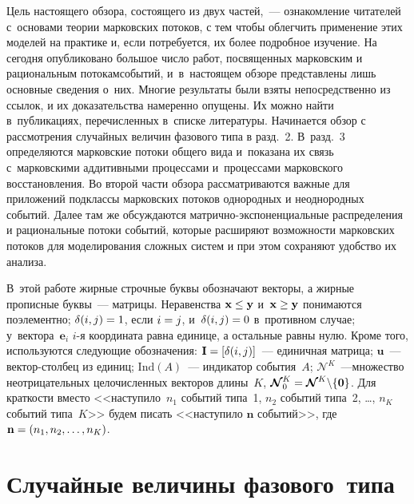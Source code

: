{\begin{multicols}{2}
    Цель настоящего обзора, состоящего из двух частей,~--- ознакомление 
читателей с~основами тео\-рии марковских потоков, с тем чтобы облегчить\linebreak 
применение этих моделей на практике и, если потребуется, их более подробное 
изучение. На сегодня опубликовано большое число работ, посвященных 
марковским и рациональным потокам\linebreak событий, и~в~настоящем обзоре 
представлены лишь основные сведения о~них. Многие результаты были взяты 
непосредственно из ссылок, и их доказательства намеренно опущены. Их 
можно найти в~пуб\-ли\-ка\-ци\-ях, перечисленных в~списке литературы. Начинается 
обзор с рассмотрения случайных величин фазового типа в разд.~2. В~разд.~3 
определяются марковские потоки общего вида и~показана их связь 
с~марковскими аддитивными процессами и~процессами марковского 
восстановления. Во второй части обзора рассматриваются важные для 
приложений подклассы марковских потоков однородных и неоднородных 
событий. Далее там же обсуждаются мат\-рич\-но-экс\-по\-нен\-ци\-аль\-ные 
распределения и рациональные потоки событий, которые расширяют 
возможности марковских потоков для моделирования сложных систем и при 
этом сохраняют удобство их анализа. 

    В~этой работе жирные строчные буквы обозначают векторы, а жирные 
прописные буквы~--- мат\-ри\-цы. Неравенства $\mathbf{x}\hm\leq 
\mathbf{y}$ и~$\mathbf{x}\hm\geq \mathbf{y}$ понимаются поэлементно; 
$\delta(i,j)\hm=1$, если $i\hm=j$, и~$\delta(i,j)\hm=0$ в~противном случае; 
у~вектора~$\mathbf{e}_i$ $i$-я координата равна единице, а остальные равны 
нулю. Кроме того, используются следующие обозначения: $\mathbf{I}\hm= 
[\delta(i,j)]$~--- единичная матрица; $\mathbf{u}$~---  век\-тор-стол\-бец из 
единиц; $\mathrm{Ind}(A)$~---  индикатор события~$A$; 
$\boldsymbol{\mathcal{N}}^K$~---множество неотрицательных целочисленных 
векторов длины~$K$, $\boldsymbol{\mathcal{N}}_0^K\hm= 
\boldsymbol{\mathcal{N}}^K\backslash \{\mathbf{0}\}$. Для краткости вместо 
<<наступило~$n_1$ событий типа~1, $n_2$ событий типа~2, \ldots, $n_K$ 
событий типа~$K$>> будем писать <<наступило $\mathbf{n}$ событий>>, где 
$\mathbf{n}\hm= (n_1, n_2, \ldots , n_K)$.

\vspace*{-6pt}

\section{Случайные величины фазового~типа}


\end{multicols}}
